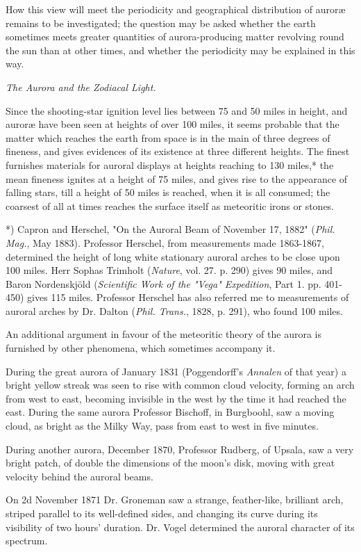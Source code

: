 \documentclass[a4paper, 12pt, oneside, polutonikogreek, english]{article}
\begin{document}
How this view will meet the periodicity and geographical distribution of auroræ remains to be investigated; the question may be asked whether the earth sometimes meets greater quantities of aurora-producing matter revolving round the sun than at other times, and whether the periodicity may be explained in this way.

\emph{The Aurora and the Zodiacal Light.}

Since the shooting-star ignition level lies between 75 and 50 miles in height, and auroræ have been seen at heights of over 100 miles, it seems probable that the matter which reaches the earth from space is in the main of three degrees of fineness, and gives evidences of its existence at three different heights. The finest furnishes materials for auroral displays at heights reaching to 130 miles,* the mean fineness ignites at a height of 75 miles, and gives rise to the appearance of falling stars, till a height of 50 miles is reached, when it is all consumed; the coarsest of all at times reaches the surface itself as meteoritic irons or stones.

*) Capron and Herschel, "On the Auroral Beam of November 17, 1882" (\emph{Phil. Mag.}, May 1883). Professor Herschel, from measurements made 1863-1867, determined the height of long white stationary auroral arches to be close upon 100 miles. Herr Sophas Trimholt (\emph{Nature}, vol. 27. p. 290) gives 90 miles, and Baron Nordenskjöld (\emph{Scientific Work of the "Vega" Expedition}, Part 1. pp. 401-450) gives 115 miles. Professor Herschel has also referred me to measurements of auroral arches by Dr. Dalton (\emph{Phil. Trans.}, 1828, p. 291), who found 100 miles.

An additional argument in favour of the meteoritic theory of the aurora is furnished by other phenomena, which sometimes accompany it.

During the great aurora of January 1831 (Poggendorff's \emph{Annalen} of that year) a bright yellow streak was seen to rise with common cloud velocity, forming an arch from west to east, becoming invisible in the west by the time it had reached the east. During the same aurora Professor Bischoff, in Burgboohl, saw a moving cloud, as bright as the Milky Way, pass from east to west in five minutes.

During another aurora, December 1870, Professor Rudberg, of Upsala, saw a very bright patch, of double the dimensions of the moon's disk, moving with great velocity behind the auroral beams.

On 2d November 1871 Dr. Groneman saw a strange, feather-like, brilliant arch, striped parallel to its well-defined sides, and changing its curve during its visibility of two hours' duration. Dr. Vogel determined the auroral character of its spectrum.
\end{document}
